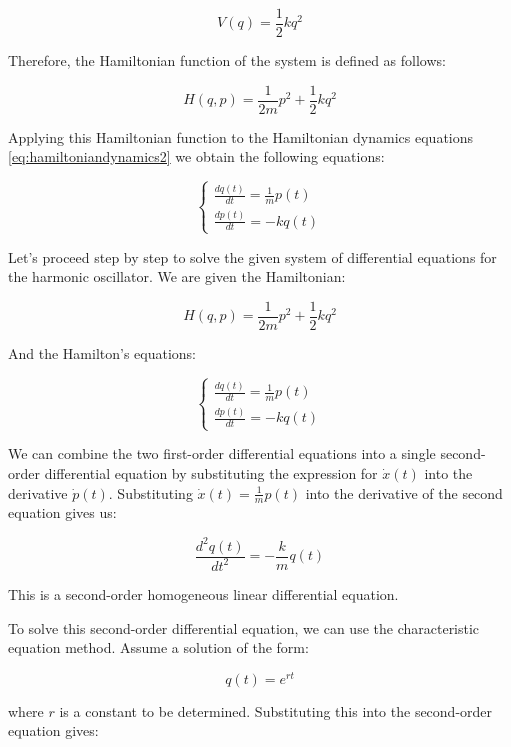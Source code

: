 \documentclass{report}
\begin{document}
\begin{equation*}
	V(q) = \frac{1}{2} k q^2
\end{equation*}

Therefore, the Hamiltonian function of the system is defined as follows:

\begin{equation}
	H(q,p) = \frac{1}{2m} p^2 + \frac{1}{2} k q^2
	\label{eq:hamiltonianharmonicoscillator}
\end{equation}

Applying this Hamiltonian function to the Hamiltonian dynamics equations \eqref{eq:hamiltoniandynamics2} we obtain the following equations:

\begin{equation*}
	\begin{cases}
		\frac{dq(t)}{dt} = \frac{1}{m} p(t) \\
		\frac{dp(t)}{dt} = -k q(t)
	\end{cases}
\end{equation*}

Let's proceed step by step to solve the given system of differential equations for the harmonic oscillator. We are given the Hamiltonian:

\[
H(q,p) = \frac{1}{2m} p^2 + \frac{1}{2} k q^2
\]

And the Hamilton's equations:

\[
	\begin{cases}
		\frac{dq(t)}{dt} = \frac{1}{m} p(t) \\
		\frac{dp(t)}{dt} = -k q(t)
	\end{cases}
\]

We can combine the two first-order differential equations into a single second-order differential equation by substituting the expression for \( \dot{x}(t) \) into the derivative \( \dot{p}(t) \). Substituting \( \dot{x}(t) = \frac{1}{m} p(t) \) into the derivative of the second equation gives us:

\[
	\frac{d^2q(t)}{dt^2} = -\frac{k}{m} q(t)
\]

This is a second-order homogeneous linear differential equation.

To solve this second-order differential equation, we can use the characteristic equation method. Assume a solution of the form:

\[
	q(t) = e^{rt}
\]

where \( r \) is a constant to be determined. Substituting this into the second-order equation gives:
\end{document}
